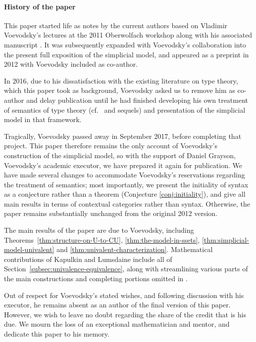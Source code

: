 \paragraph*{History of the paper}
This paper started life as notes by the current authors based on Vladimir Voevodsky's lectures at the 2011 Oberwolfach workshop \cite{oberwolfach-report} along with his associated manuscript \cite{voevodsky:notes-on-type-systems}.
It was subsequently expanded with Voevodsky’s collaboration into the present full exposition of the simplicial model, and appeared as a preprint in 2012 with Voevodsky included as co-author.

In 2016, due to his dissatisfaction with the existing literature on type theory, which this paper took as background, Voevodsky asked us to remove him as co-author and delay publication until he had finished developing his own treatment of semantics of type theory (cf.~\cite{voevodsky:c-system-of-module} and sequels) and presentation of the simplicial model in that framework.

Tragically, Voevodsky passed away in September 2017, before completing that project.  This paper therefore remains the only account of Voevodsky's construction of the simplicial model, so with the support of Daniel Grayson, Voevodsky’s academic executor, we have prepared it again for publication.  We have made several changes to accommodate Voevodsky's reservations regarding the treatment of semantics; most importantly, we present the initiality of syntax as a conjecture rather than a theorem (Conjecture \ref{conj:initiality}), and give all main results in terms of contextual categories rather than syntax.  Otherwise, the paper remains substantially unchanged from the original 2012 version.

The main results of the paper are due to Voevodsky, including Theorems~\ref{thm:structure-on-U-to-CU}, \ref{thm:the-model-in-ssets}, \ref{thm:simplicial-model-univalent} and \ref{thm:univalent-characterization}. Mathematical contributions of Kapulkin and Lumsdaine include all of Section~\ref{subsec:univalence-equivalence}, along with streamlining various parts of the main constructions and completing portions omitted in \cite{voevodsky:notes-on-type-systems}.

Out of respect for Voevodsky’s stated wishes, and following discussion with his executor, he remains absent as an author of the final version of this paper. 
%
However, we wish to leave no doubt regarding the share of the credit that is his due.
%
We mourn the loss of an exceptional mathematician and mentor, and dedicate this paper to his memory.


